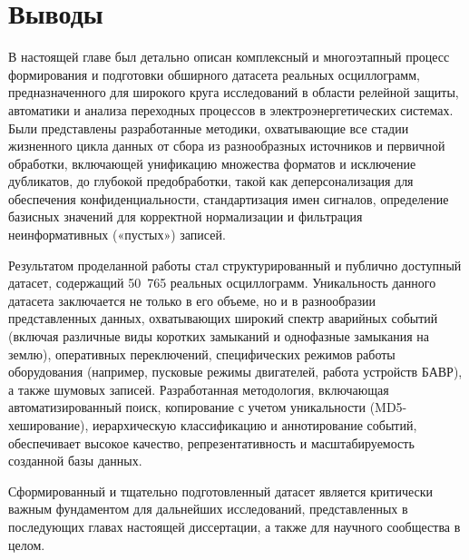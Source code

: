
\section{Выводы}
\label{sec:ch03_conclusions}

В настоящей главе был детально описан комплексный и многоэтапный процесс формирования и
подготовки обширного датасета реальных осциллограмм, предназначенного для широкого круга
исследований в области релейной защиты, автоматики и анализа переходных процессов в
электроэнергетических системах. Были представлены разработанные методики, охватывающие
все стадии жизненного цикла данных от сбора из разнообразных источников и первичной
обработки, включающей унификацию множества форматов и исключение дубликатов, до глубокой
предобработки, такой как деперсонализация для обеспечения конфиденциальности,
стандартизация имен сигналов, определение базисных значений для корректной нормализации
и фильтрация неинформативных («пустых») записей.

Результатом проделанной работы стал структурированный и публично доступный датасет,
содержащий 50~765 реальных осциллограмм. Уникальность данного датасета заключается не
только в его объеме, но и в разнообразии представленных данных, охватывающих широкий
спектр аварийных событий (включая различные виды коротких замыканий и однофазные
замыкания на землю), оперативных переключений, специфических режимов работы оборудования
(например, пусковые режимы двигателей, работа устройств БАВР), а также шумовых записей.
Разработанная методология, включающая автоматизированный поиск, копирование с учетом
уникальности (MD5-хеширование), иерархическую классификацию и аннотирование событий,
обеспечивает высокое качество, репрезентативность и масштабируемость созданной базы
данных.

Сформированный и тщательно подготовленный датасет является критически важным фундаментом
для дальнейших исследований, представленных в последующих главах настоящей диссертации,
а также для научного сообщества в целом.

